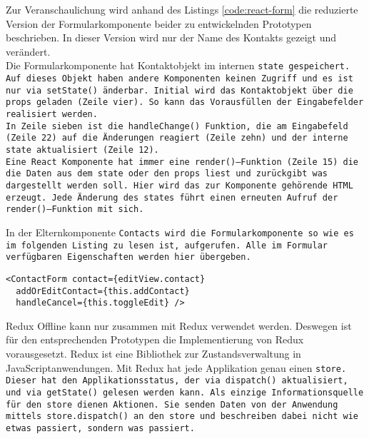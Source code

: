 Zur Veranschaulichung wird anhand des Listings \ref{code:react-form} die reduzierte Version der Formularkomponente beider zu entwickelnden Prototypen beschrieben. In dieser Version wird nur der Name des Kontakts gezeigt und verändert.\\
Die Formularkomponente hat Kontaktobjekt im internen \tt{state} gespeichert. Auf dieses Objekt haben andere Komponenten keinen Zugriff und es ist nur via \tt{setState()} änderbar.
Initial wird das Kontaktobjekt über die \tt{props} geladen (Zeile vier). So kann das Vorausfüllen der Eingabefelder realisiert werden.\\
In Zeile sieben ist die \tt{handleChange()} Funktion, die am Eingabefeld (Zeile 22) auf die Änderungen reagiert (Zeile zehn) und der interne \tt{state} aktualisiert (Zeile 12).\\
Eine React Komponente hat immer eine \tt{render()}--Funktion (Zeile 15) die die Daten aus dem \tt{state} oder den \tt{props} liest und zurückgibt was dargestellt werden soll. Hier wird das zur Komponente gehörende \gls{HTML} erzeugt. Jede Änderung des \tt{state}s führt einen erneuten Aufruf der \tt{render()}--Funktion mit sich.
\begin{center}

\end{center}
In der Elternkomponente \tt{Contacts} wird die Formularkomponente so wie es im folgenden Listing zu lesen ist, aufgerufen. Alle im Formular verfügbaren Eigenschaften werden hier übergeben.
\begin{lstlisting}
<ContactForm contact={editView.contact}
  addOrEditContact={this.addContact}
  handleCancel={this.toggleEdit} />
\end{lstlisting}
%
%
Redux Offline kann nur zusammen mit Redux verwendet werden. Deswegen ist für den entsprechenden Prototypen die Implementierung von Redux vorausgesetzt.
Redux ist eine Bibliothek zur Zustandsverwaltung in JavaScriptanwendungen.
Mit Redux hat jede Applikation genau einen \tt{store}. Dieser hat den Applikationsstatus, der via \tt{dispatch()} aktualisiert, und via \tt{getState()} gelesen werden kann.
Als einzige Informationsquelle für den \tt{store} dienen Aktionen. Sie senden Daten von der Anwendung mittels \tt{store.dispatch()} an den \tt{store} und beschreiben dabei nicht wie etwas passiert, sondern was passiert.\\
